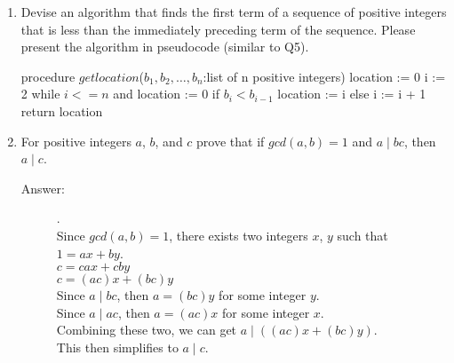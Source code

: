 \documentclass[12pt, oneside]{article}
\begin{document}
\begin{enumerate}
\item Devise an algorithm that finds the first term of a sequence of positive integers that is less than the immediately preceding term of the sequence. Please present the algorithm in pseudocode (similar to Q5).
\begin{algorithm}[caption={Location of first term less than next term algorithm}]
    procedure $\textit{getlocation}$($b_1,b_2,…,b_n$:list of n positive integers)
    location := 0
    i := 2
    while $i <= n$ and location := 0
        if $b_i < b_{i-1}$
            location := i
        else
            i := i + 1
    return location
    \end{algorithm}

\item For positive integers $a$, $b$, and $c$ prove that if $gcd(a,b)=1$ and $a \mid bc$, then $a \mid c$.
\begin{description}
    \item[Answer:] .\\
        Since $gcd(a,b)=1$, there exists two integers $x$, $y$ such that $1=ax+by$.\\
        $c=cax+cby$\\
        $c=(ac)x+(bc)y$\\
        Since $a \mid bc$, then $a=(bc)y$ for some integer $y$.\\
        Since $a \mid ac$, then $a=(ac)x$ for some integer $x$.\\
        Combining these two, we can get $a \mid ((ac)x+(bc)y)$.\\
        This then simplifies to $a \mid c$.
    \end{description}
\end{enumerate}
\end{document}
